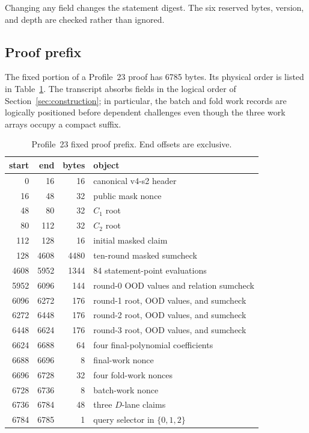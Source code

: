 Changing any field changes the statement digest.  The six reserved bytes,
version, and depth are checked rather than ignored.

\subsection{Proof prefix}

The fixed portion of a Profile~23 proof has 6785 bytes.  Its physical order
is listed in Table~\ref{tab:proof-prefix-wire}.  The transcript absorbs fields
in the logical order of Section~\ref{sec:construction}; in particular, the
batch and fold work records are logically positioned before dependent
challenges even though the three work arrays occupy a compact suffix.

\begin{table}[ht]
\centering
\small
\caption{Profile~23 fixed proof prefix.  End offsets are exclusive.}
\label{tab:proof-prefix-wire}
\begin{tabular}{@{}rrrl@{}}
\toprule
start & end & bytes & object \\
\midrule
0 & 16 & 16 & canonical v4-s2 header \\
16 & 48 & 32 & public mask nonce \\
48 & 80 & 32 & \(C_1\) root \\
80 & 112 & 32 & \(C_2\) root \\
112 & 128 & 16 & initial masked claim \\
128 & 4608 & 4480 & ten-round masked sumcheck \\
4608 & 5952 & 1344 & 84 statement-point evaluations \\
5952 & 6096 & 144 & round-0 OOD values and relation sumcheck \\
6096 & 6272 & 176 & round-1 root, OOD values, and sumcheck \\
6272 & 6448 & 176 & round-2 root, OOD values, and sumcheck \\
6448 & 6624 & 176 & round-3 root, OOD values, and sumcheck \\
6624 & 6688 & 64 & four final-polynomial coefficients \\
6688 & 6696 & 8 & final-work nonce \\
6696 & 6728 & 32 & four fold-work nonces \\
6728 & 6736 & 8 & batch-work nonce \\
6736 & 6784 & 48 & three \(D\)-lane claims \\
6784 & 6785 & 1 & query selector in \(\{0,1,2\}\) \\
\bottomrule
\end{tabular}
\end{table}

